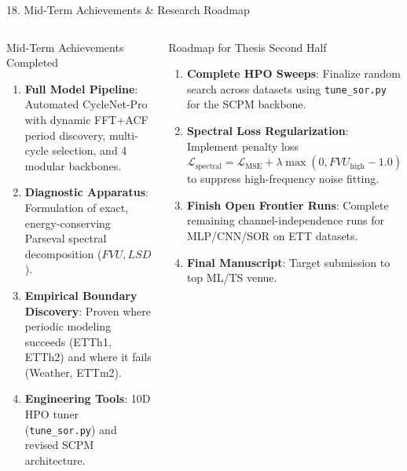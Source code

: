 \documentclass[aspectratio=169, 10pt]{beamer}
\begin{document}
\begin{frame}{18. Mid-Term Achievements \& Research Roadmap}
\begin{columns}[T]
\begin{exampleblock}{Mid-Term Achievements Completed}
\begin{enumerate}
    \item \textbf{Full Model Pipeline}: Automated CycleNet-Pro with dynamic FFT+ACF period discovery, multi-cycle selection, and 4 modular backbones.
    \item \textbf{Diagnostic Apparatus}: Formulation of exact, energy-conserving Parseval spectral decomposition ($FVU, LSD$).
    \item \textbf{Empirical Boundary Discovery}: Proven where periodic modeling succeeds (ETTh1, ETTh2) and where it fails (Weather, ETTm2).
    \item \textbf{Engineering Tools}: 10D HPO tuner (\texttt{tune\_sor.py}) and revised SCPM architecture.
\end{enumerate}
\end{exampleblock}

\begin{block}{Roadmap for Thesis Second Half}
\begin{enumerate}
    \item \textbf{Complete HPO Sweeps}: Finalize random search across datasets using \texttt{tune\_sor.py} for the SCPM backbone.
    \item \textbf{Spectral Loss Regularization}: Implement penalty loss $\mathcal{L}_{\text{spectral}} = \mathcal{L}_{\text{MSE}} + \lambda \max(0, FVU_{\text{high}} - 1.0)$ to suppress high-frequency noise fitting.
    \item \textbf{Finish Open Frontier Runs}: Complete remaining channel-independence runs for MLP/CNN/SOR on ETT datasets.
    \item \textbf{Final Manuscript}: Target submission to top ML/TS venue.
\end{enumerate}
\end{block}
\end{columns}
\end{frame}
\end{document}
